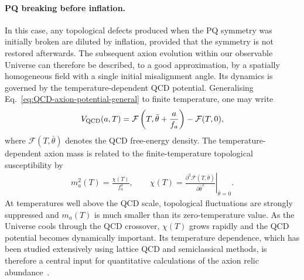 \documentclass[review]{elsarticle}
\numberwithin{equation}{section}
\numberwithin{table}{section}
\numberwithin{figure}{section}
\begin{document}
\paragraph{PQ breaking before inflation.}

In this case, any topological defects produced when the PQ symmetry was initially broken are diluted by inflation, provided that the symmetry is not restored afterwards. The subsequent axion evolution within our observable Universe can therefore be described, to a good approximation, by a spatially homogeneous field with a single initial misalignment angle. Its dynamics is governed by the temperature-dependent QCD potential. Generalising Eq.~\eqref{eq:QCD-axion-potential-general} to finite temperature, one may write
\begin{align}
    V_{\rm QCD}(a,T)
    =
    \mathcal{F}
    \left(
        T,\bar\theta+\frac{a}{f_a}
    \right)
    -
    \mathcal{F}(T,0),
    \label{eq:finite-temperature-axion-potential}
\end{align}
where $\mathcal{F}(T,\bar\theta)$ denotes the QCD free-energy density. The temperature-dependent axion mass is related to the finite-temperature topological susceptibility by
\begin{align}
    m_a^2(T)
    =
    \frac{\chi(T)}{f_a^2},
    \qquad
    \chi(T)
    =
    \left.
    \frac{\partial^2\mathcal{F}(T,\bar\theta)}
         {\partial\bar\theta^2}
    \right|_{\bar\theta=0}.
    \label{eq:finite-temperature-axion-mass}
\end{align}
At temperatures well above the QCD scale, topological fluctuations are strongly suppressed and $m_a(T)$ is much smaller than its zero-temperature value. As the Universe cools through the QCD crossover, $\chi(T)$ grows rapidly and the QCD potential becomes dynamically important. Its temperature dependence, which has been studied extensively using lattice QCD and semiclassical methods, is therefore a central input for quantitative calculations of the axion relic abundance~\cite{Borsanyi:2016ksw}.
\end{document}
